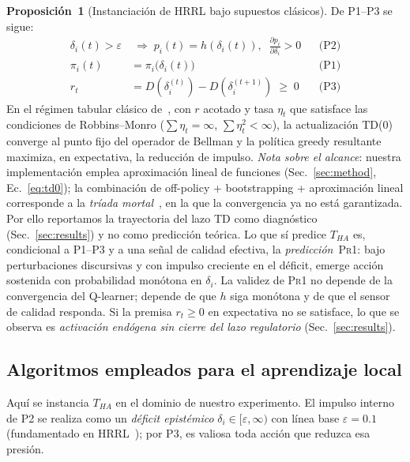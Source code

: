 \documentclass{llncs}
\begin{document}
\noindent\textbf{Proposici\'on~1} (Instanciaci\'on de HRRL bajo
supuestos cl\'asicos). De P1--P3 se sigue:
\begin{align*}
\delta_i(t) > \varepsilon &\;\Rightarrow\; p_i(t) = h(\delta_i(t)),\;\;
  \tfrac{\partial p_i}{\partial \delta_i} > 0 &&\text{(P2)} \\
\pi_i(t) &= \pi_i\!\bigl(\delta_i(t)\bigr) &&\text{(P1)} \\
r_t &= D(\delta_i^{(t)}) - D(\delta_i^{(t+1)}) \;\ge\; 0 &&\text{(P3)}
\end{align*}
En el r\'egimen tabular cl\'asico de~\textcite{keramati2014homeostatic},
con $r$ acotado y tasa $\eta_t$ que satisface las condiciones de
Robbins--Monro ($\sum \eta_t = \infty$, $\sum \eta_t^2 < \infty$), la
actualizaci\'on TD(0) converge al punto fijo del operador de Bellman y
la pol\'itica greedy resultante maximiza, en expectativa, la
reducci\'on de impulso. \emph{Nota sobre el alcance}: nuestra
implementaci\'on emplea aproximaci\'on lineal de funciones
(Sec.~\ref{sec:method}, Ec.~\ref{eq:td0}); la combinaci\'on de
off-policy + bootstrapping + aproximaci\'on lineal corresponde a la
\emph{tr\'iada mortal}~\parencite{baird1995residual,sutton2018reinforcement},
en la que la convergencia ya no est\'a garantizada. Por ello reportamos
la trayectoria del lazo TD como diagn\'ostico (Sec.~\ref{sec:results})
y no como predicci\'on te\'orica. Lo que s\'i predice
$T_{HA}$ es, condicional a P1--P3 y a una se\~nal de calidad efectiva,
la \emph{predicci\'on}~\textsc{Pr1}: bajo perturbaciones discursivas y
con impulso creciente en el d\'eficit, emerge acci\'on sostenida con
probabilidad mon\'otona en $\delta_i$. La validez de \textsc{Pr1} no
depende de la convergencia del Q-learner; depende de que $h$ siga
mon\'otona y de que el sensor de calidad responda. Si la premisa
$r_t \ge 0$ en expectativa no se satisface, lo que se observa es
\emph{activaci\'on end\'ogena sin cierre del lazo regulatorio}
(Sec.~\ref{sec:results}).

\subsection{Algoritmos empleados para el aprendizaje local}

Aqu\'i se instancia $T_{HA}$ en el dominio de nuestro experimento. El impulso interno
de P2 se realiza como un \emph{d\'eficit epist\'emico}
$\delta_i \in [\varepsilon, \infty)$ con l\'inea base $\varepsilon = 0.1$
(fundamentado en HRRL~\parencite{keramati2014homeostatic}); por P3, es
valiosa toda acci\'on que reduzca esa presi\'on.
\end{document}
